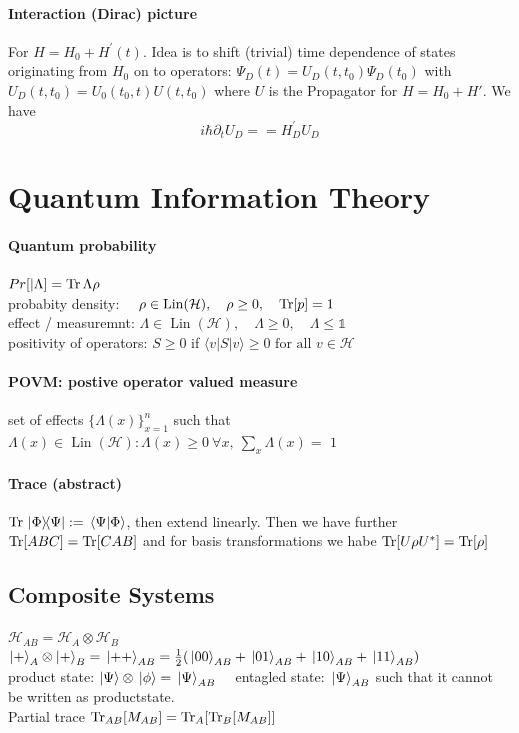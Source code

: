 \paragraph{Interaction (Dirac) picture} For $H=H_0+H^{\prime}(t)$. Idea is to shift (trivial) time dependence
of states originating from $H_0$ on to operators: $\Psi_D(t)=U_D\left(t, t_0\right) \Psi_D\left(t_0\right) $ with 
$U_D\left(t, t_0\right)=U_0\left(t_0, t\right) U\left(t, t_0\right)$ where $U$ is the Propagator for $H=H_0 +H'$. We have 
$$i \hbar \partial_t U_D = =H_D^{\prime} U_D$$


\section{Quantum Information Theory}
\paragraph{Quantum probability}
$Pr[|\Lambda] = \Trace{\Lambda \rho} $\\
probabity density: $\quad \rho \in \operatorname{Lin}(\mathcal{H}), \quad \rho \geq 0, \quad \Trace[p] =1$\\
effect / measuremnt: $\Lambda \in \operatorname{Lin}(\mathcal{H}), \quad \Lambda \geq 0, \quad \Lambda \leq \mathbb{1}$\\

positivity of operators: $S \geq 0$ if $\langle v|S| v\rangle \geq 0 \text { for all } v \in \mathcal{H}$

\paragraph{POVM: postive operator valued measure} set of effects $\{ \Lambda (x)\}^n_{x=1}$ such that
$\Lambda(x) \in \operatorname{Lin}(\mathcal{H}) : \Lambda(x) \geq 0 \ \forall x, \ \sum_x \Lambda(x) =$ $1$

\paragraph{Trace (abstract)} $\Trace{\ketbra*{\Phi}{\Psi}} := \braket*{\Psi}{\Phi}$, then extend linearly. Then we have further\\
$\Trace[ABC]= \Trace[CAB]$ and for basis transformations we habe $\Tr[U \rho U^* ]= \Tr[\rho]$\\

\subsection{Composite Systems} 
$\mathcal{H}_{AB} = \mathcal{H}_A \otimes \mathcal{H}_B$\\
$\ket{+}_A\otimes \ket{+}_B = \ket*{++}_{AB} = \frac{1}{2} (\ket*{00}_{AB}+ \ket*{01}_{AB}+ \ket*{10}_{AB}+\ket*{11}_{AB})$\\
product state: $\ket{\Psi}\otimes \ket*{\phi} = \ket*{\Psi}_{AB} \quad$ entagled state: $\ket*{\Psi}_{AB}$ such that it cannot be written as productstate.\\
Partial trace $\Tr_{AB}[M_{AB}] = \Tr_A[\Tr_B[M_{AB}]]$

